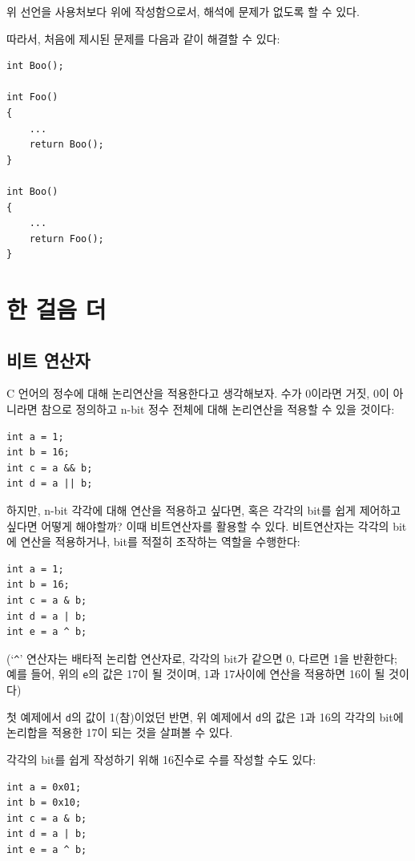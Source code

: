 \documentclass[a4paper,12pt]{book}
\newcommand{\V}[1]{\Verb|#1|}
\begin{document}
위 선언을 사용처보다 위에 작성함으로서,
해석에 문제가 없도록 할 수 있다.

따라서, 처음에 제시된 문제를 다음과 같이 해결할 수 있다:

\begin{lstlisting}
int Boo();

int Foo()
{
    ...
    return Boo();
}

int Boo()
{
    ...
    return Foo();
}
\end{lstlisting}


\chapter{한 걸음 더}

\section{비트 연산자}

    C 언어의 정수에 대해 논리연산을 적용한다고 생각해보자.
    수가 0이라면 거짓, 0이 아니라면 참으로 정의하고 n-bit 정수 전체에 대해 논리연산을 적용할 수 있을 것이다:

    \begin{lstlisting}
int a = 1;
int b = 16;
int c = a && b;
int d = a || b;
    \end{lstlisting}

    하지만, n-bit 각각에 대해 연산을 적용하고 싶다면, 혹은 각각의 bit를 쉽게 제어하고 싶다면 어떻게 해야할까?
    이때 비트연산자를 활용할 수 있다.
    비트연산자는 각각의 bit에 연산을 적용하거나, bit를 적절히 조작하는 역할을 수행한다:

    \begin{lstlisting}
int a = 1;
int b = 16;
int c = a & b;
int d = a | b;
int e = a ^ b;
    \end{lstlisting}

    (`\V{^}' 연산자는 배타적 논리합 연산자로, 각각의 bit가 같으면 0, 다르면 1을 반환한다;
    예를 들어, 위의 \V{e}의 값은 17이 될 것이며, 1과 17사이에 연산을 적용하면 16이 될 것이다)

    첫 예제에서 \V{d}의 값이 1(참)이었던 반면,
    위 예제에서 \V{d}의 값은 1과 16의 각각의 bit에 논리합을 적용한 17이 되는 것을 살펴볼 수 있다.

    각각의 bit를 쉽게 작성하기 위해 16진수로 수를 작성할 수도 있다:

    \begin{lstlisting}
int a = 0x01;
int b = 0x10;
int c = a & b;
int d = a | b;
int e = a ^ b;
    \end{lstlisting}
\end{document}
